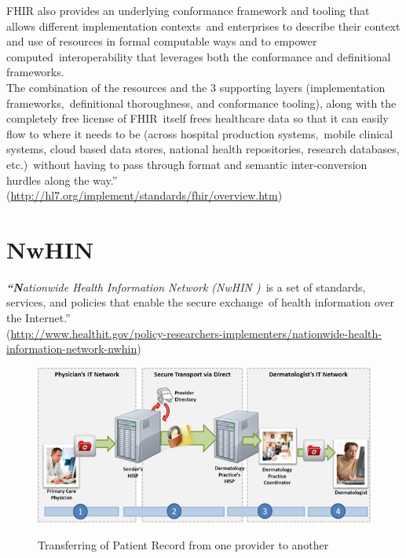 \documentclass[DIV=calc, paper=a4, fontsize=12pt, onecolumn]{scrartcl}	 %
\newcommand{\initial}[1]{ %
\lettrine[lines=3,lhang=0.3,nindent=0em,slope=0em]{
\color{DarkBlue}
{\textbf{\textit{#1}}}}{}}
\begin{document}
FHIR also provides an underlying conformance framework and tooling that allows different implementation contexts\ 
and enterprises to describe their context and use of resources in formal computable ways and to empower computed\
 interoperability that leverages both the conformance and definitional frameworks.\\

The combination of the resources and the 3 supporting layers (implementation frameworks,\
definitional thoroughness, and conformance tooling), along with the completely free license of FHIR\
 itself frees healthcare data so that it can easily flow to where it needs to be (across hospital production systems,\
 mobile clinical systems, cloud based data stores, national health repositories, research databases, etc.)\
without having to pass through format and semantic inter-conversion hurdles along the way.''\\
 (\url{http://hl7.org/implement/standards/fhir/overview.htm})



\section[Nationwide Health Information Network (NwHIN)]{NwHIN}
  \label{sec:nwhin}

\initial{``N}\textit{ationwide Health Information Network (NwHIN )}\
is a set of standards, services, and policies that enable the secure exchange\
of health information over the Internet.''\\
(\url{http://www.healthit.gov/policy-researchers-implementers/nationwide-health-information-network-nwhin})\\

  \begin{figure}[ht!]
    \centering
    \includegraphics[scale=0.5]{nwhin.png}
    \caption{Transferring of Patient Record from one provider to another}
    \cite[Fig.~1]{belleau_bio2rdf:_2008}
    \label{fig:nwhin}
  \end{figure}  
\end{document}
